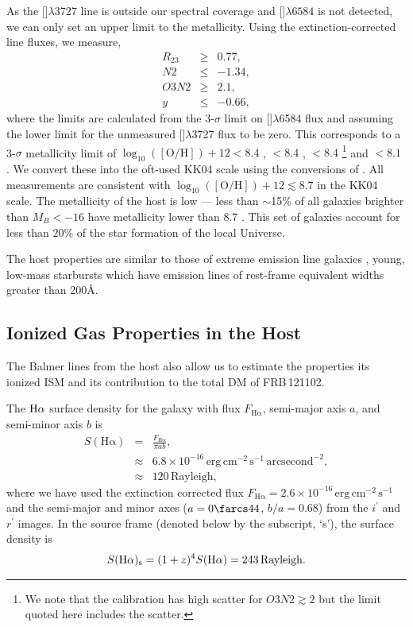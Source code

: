 \documentclass[twocolumn]{aastex61}
\def \frb {FRB\,121102}
\def \halpha {\ensuremath{\mathrm{H\alpha}}}
\newcommand{\be}{\begin{eqnarray}}
\newcommand{\ee}{\end{eqnarray}}
\newcommand{\Halpha}{\rm H\alpha}
\newcommand{\Ss}{S({\rm\halpha})_{\rm s}}
\begin{document}
As the []$\lambda$3727 line is outside our spectral coverage and []$\lambda6584$ is not detected, we can only set an upper limit to the metallicity. Using the extinction-corrected line fluxes, we measure, 
\be 
R_{23}& \geq & 0.77, \nonumber\\
N2 & \leq & -1.34,\nonumber \\
O3N2 & \geq & 2.1, \nonumber \\
y & \leq & -0.66, \nonumber 
\ee
where the limits are calculated from the 3-$\sigma$ limit on []$\lambda$6584 flux and assuming the lower limit for the unmeasured  []$\lambda$3727 flux to be zero. This corresponds to a 3-$\sigma$ metallicity limit of $\log_{10}([\mathrm{O/H}]) + 12 < 8.4$ \citep{kd02}, $<8.4$ \citep[][, $N2$]{pp04}, $<8.4$ \citep[][$O3N2$]{pp04}\footnote{We note that the \citet{pp04} calibration has high scatter for $O3N2\gtrsim2$ but the limit quoted here includes the scatter.} and $<8.1$ \citep[][not including scatter]{dksn16}. We convert these into the oft-used KK04 scale \citep{kk04} using the conversions of \citet{ke08}. All measurements are consistent with $\log_{10}([\mathrm{O/H}]) + 12 \lesssim 8.7$ in the KK04 scale. The metallicity of the host is low  --- less than $\sim$15\% of all galaxies brighter than $M_B<-16$ have metallicity lower than 8.7 \citep[][]{gf15b}. This set of galaxies account for less than $20$\% of the star formation of the local Universe.

The host properties are similar to those of extreme emission line galaxies  \citep[EELGs; ][]{ass+11}, young, low-mass starbursts which have emission lines of rest-frame equivalent widths greater than 200\AA. 

\subsection{Ionized Gas  Properties in the Host}


The Balmer lines from the host also allow us to estimate the properties its ionized ISM  and its contribution to the total DM of \frb.

The $\Halpha$ surface density for the galaxy with  flux $F_{\halpha}$, semi-major axis $a$, and semi-minor axis $b$ is
\be
S(\halpha) &=& \frac{F_{\halpha}}{\pi a b}, \nonumber\\
&\approx&  6.8 \times 10^{-16}\,\mathrm{erg\,cm^{-2}\,s^{-1}\,arcsecond^{-2}}, \nonumber\\
&\approx&  120 \,\mathrm{Rayleigh},
\ee
where we have used the extinction corrected flux $F_{\halpha} = 2.6\times10^{-16}\,\mathrm{erg\,cm^{-2}\,s^{-1}}$ and the semi-major and minor axes ($a = 0\farcs44$, $b/a=0.68$) from the $i^\prime$ and $r^\prime$ images. In the source frame (denoted below by the subscript, `s'), the surface density is
\be
\Ss = (1+z)^4 S(\halpha) = 243\,\mathrm{Rayleigh}. 
\ee
\end{document}

